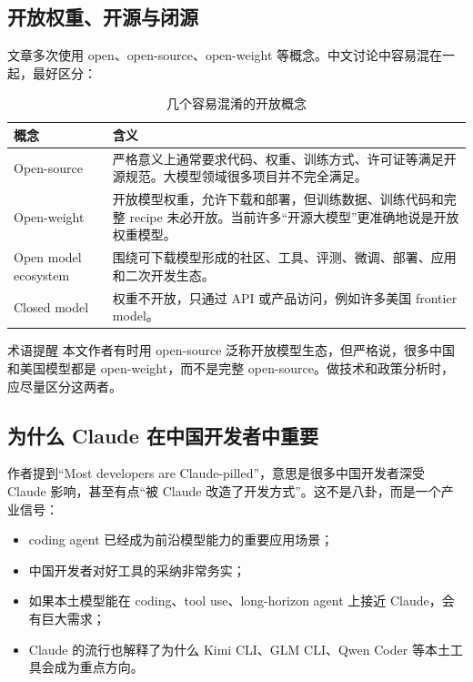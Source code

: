 \subsection{开放权重、开源与闭源}

文章多次使用 open、open-source、open-weight 等概念。中文讨论中容易混在一起，最好区分：

\begin{table}[H]
\centering
\caption{几个容易混淆的开放概念}
\begin{tabular}{@{}p{3.2cm}p{10cm}@{}}
\toprule
\textbf{概念} & \textbf{含义} \\
\midrule
Open-source & 严格意义上通常要求代码、权重、训练方式、许可证等满足开源规范。大模型领域很多项目并不完全满足。 \\
Open-weight & 开放模型权重，允许下载和部署，但训练数据、训练代码和完整 recipe 未必开放。当前许多``开源大模型''更准确地说是开放权重模型。 \\
Open model ecosystem & 围绕可下载模型形成的社区、工具、评测、微调、部署、应用和二次开发生态。 \\
Closed model & 权重不开放，只通过 API 或产品访问，例如许多美国 frontier model。 \\
\bottomrule
\end{tabular}
\end{table}

\begin{warningbox}{术语提醒}
本文作者有时用 open-source 泛称开放模型生态，但严格说，很多中国和美国模型都是 open-weight，而不是完整 open-source。做技术和政策分析时，应尽量区分这两者。
\end{warningbox}

\subsection{为什么 Claude 在中国开发者中重要}

作者提到``Most developers are Claude-pilled''，意思是很多中国开发者深受 Claude 影响，甚至有点``被 Claude 改造了开发方式''。这不是八卦，而是一个产业信号：

\begin{itemize}[leftmargin=1.5em]
    \item coding agent 已经成为前沿模型能力的重要应用场景；
    \item 中国开发者对好工具的采纳非常务实；
    \item 如果本土模型能在 coding、tool use、long-horizon agent 上接近 Claude，会有巨大需求；
    \item Claude 的流行也解释了为什么 Kimi CLI、GLM CLI、Qwen Coder 等本土工具会成为重点方向。
\end{itemize}

